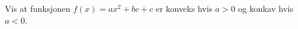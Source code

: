 





\opgt

Vis at funksjonen $ {f(x)=a x^2+b c + c}  $ er konveks hvis $ {a>0} $ og konkav hvis $ {a<0} $.


